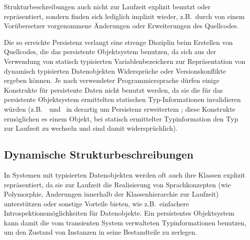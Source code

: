 Strukturbeschreibungen auch nicht zur Laufzeit explizit benutzt oder
repr\"{a}sentiert, sondern finden sich lediglich implizit wieder,
z.B.\ durch von einem Vor\"{u}bersetzer vorgenommene \"{A}n\-de\-run\-gen
oder Erweiterungen des Quellcodes. 
%
\par{}Die so erreichte Persistenz verlangt eine strenge Disziplin beim
Erstellen von Quellcodes, die das persistente Objektsystem benutzen,
da sich aus der Verwendung von statisch typisierten
Variablenbezeichern zur Repr\"{a}sentation von dynamisch typisierten
Datenobjekten Widerspr\"{u}che oder Versionskonflikte ergeben k\"{o}nnen. Je
nach verwendeter Programmiersprache d\"{u}rfen einige Konstrukte f\"{u}r
persistente Daten nicht benutzt werden, da sie die f\"{u}r das
persistente Objektsystem ermittelten statischen Typ-Informationen
invalidieren w\"{u}rden (z.B.\ \ und
\ in derartig um Persistenz
erweitertem \cpp; diese Konstrukte erm\"{o}glichen es einem Objekt, bei
statisch ermittelter Typinformation den Typ zur Laufzeit zu wechseln
und sind damit widerspr\"{u}chlich).
%
\subsection{Dynamische Strukturbeschreibungen}%
%
In Systemen mit typisierten Datenobjekten werden oft auch ihre Klassen
explizit repr\"{a}sentiert, da sie zur Laufzeit die Realisierung von
Sprachkonzepten (wie Polymorphie, \"{A}nderungen innerhalb der
Klassenhierarchie zur Laufzeit) unterst\"{u}tzen oder sonstige Vorteile
bieten, wie z.B.\ einfachere Introspektionsm\"{o}glichkeiten f\"{u}r
Datenobjekte. Ein persistentes Objektsystem kann damit die vom
transienten System verwalteten Typinformationen benutzen, um den
Zustand von Instanzen in seine Bestandteile zu zerlegen.
%
